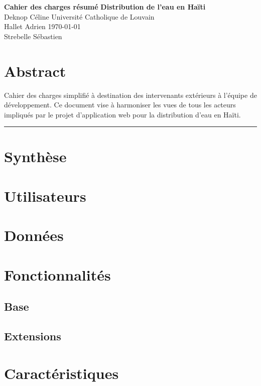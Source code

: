 \documentclass[a4paper, 11pt]{article}
\begin{document}
\noindent
\large\textbf{Cahier des charges résumé} \hfill \textbf{Distribution de l'eau en Haïti} \\
\normalsize Deknop Céline \hfill Université Catholique de Louvain \\
Hallet Adrien \hfill \today \\
Strebelle Sébastien

\section*{Abstract}
Cahier des charges simplifié à destination des intervenants extérieurs à l'équipe de développement. Ce document vise à harmoniser les vues de tous les acteurs impliqués par le projet d'application web pour la distribution d'eau en Haïti.
\hrule

\section{Synthèse}

\section{Utilisateurs}

\section{Données}

\section{Fonctionnalités}
  \subsection{Base}
  \subsection{Extensions}

\section{Caractéristiques}
\end{document}
